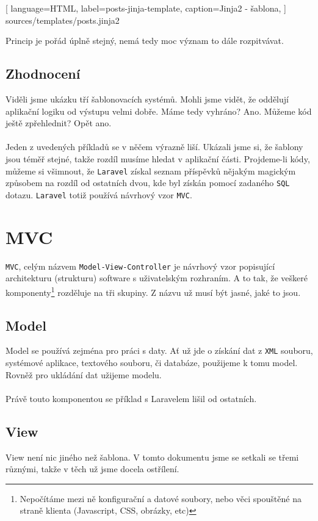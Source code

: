 \documentclass[10pt,a4paper]{article}
\begin{document}
			
			[
				language=HTML,
				label=posts-jinja-template,
				caption={Jinja2 - šablona},
			] {sources/templates/posts.jinja2}
			\vspace{10pt}

			Princip je pořád úplně stejný, nemá tedy moc význam to dále rozpitvávat.

		\subsection{Zhodnocení}
			Viděli jsme ukázku tří šablonovacích systémů. Mohli jsme vidět, že oddělují aplikační logiku od výstupu velmi dobře. Máme tedy vyhráno? Ano. Můžeme kód ještě zpřehlednit? Opět ano.
			\\
			\\
			Jeden z uvedených příkladů se v něčem výrazně liší. Ukázali jsme si, že šablony jsou téměř stejné, takže rozdíl musíme hledat v aplikační části. Projdeme-li kódy, můžeme si všimnout, že \texttt{Laravel} získal seznam příspěvků nějakým magickým způsobem na rozdíl od ostatních dvou, kde byl získán pomocí zadaného \texttt{SQL} dotazu. \texttt{Laravel} totiž používá návrhový vzor \texttt{MVC}.


	\newpage
	\section{MVC}
		\texttt{MVC}, celým názvem \texttt{Model-View-Controller} je návrhový vzor popisující architekturu (strukturu) software s uživatelským rozhraním. A to tak, že veškeré komponenty\footnote{Nepočítáme mezi ně konfigurační a datové soubory, nebo věci spouštěné na straně klienta (Javascript, CSS, obrázky, etc)} rozděluje na tři skupiny. Z názvu už musí být jasné, jaké to jsou.


		\subsection{Model}
			Model se používá zejména pro práci s daty. Ať už jde o získání dat z \texttt{XML} souboru, systémové aplikace, textového souboru, či databáze, použijeme k tomu model. Rovněž pro ukládání dat užijeme modelu.
			\\
			\\
			Právě touto komponentou se příklad s Laravelem lišil od ostatních.

		\subsection{View}
			View není nic jiného než šablona. V tomto dokumentu jsme se setkali se třemi různými, takže v těch už jsme docela ostřílení.
\end{document}
